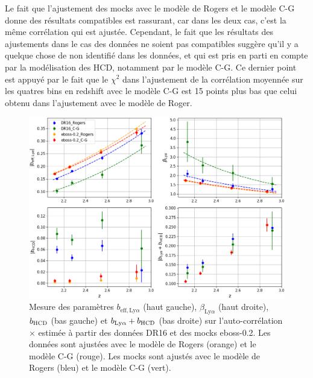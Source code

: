 \documentclass[11pt, twoside, a4paper, openright]{report}
\begin{document}
Le fait que l'ajustement des mocks avec le modèle de Rogers et le modèle C-G donne des résultats compatibles est rassurant, car dans les deux cas, c'est la même corrélation qui est ajustée. Cependant, le fait que les résultats des ajustements dans le cas des données ne soient pas compatibles suggère qu'il y a quelque chose de non identifié dans les données, et qui est pris en parti en compte par la modélisation des HCD, notamment par le modèle C-G. Ce dernier point est appuyé par le fait que le $\chi^2$ dans l'ajustement de la corrélation moyennée sur les quatres bins en redshift avec le modèle C-G est 15 points plus bas que celui obtenu dans l'ajustement avec le modèle de Roger.

\begin{figure}
  \centering
  \includegraphics[scale=0.44]{bias_CG_mask}
  \caption{Mesure des paramètres $b_{\mathrm{eff},\mathrm{Ly}\alpha}$ (haut gauche), $\beta_{\mathrm{Ly}\alpha}$ (haut droite), $b_{\textsc{HCD}}$ (bas gauche) et $b_{\mathrm{Ly}\alpha} + b_{\textsc{HCD}}$ (bas droite) sur l'auto-corrélation \lya$\times$\lya{} estimée à partir des données DR16 et des mocks eboss-0.2. Les données sont ajustées avec le modèle de Rogers (orange) et le modèle C-G (rouge). Les mocks sont ajustés avec le modèle de Rogers (bleu) et le modèle C-G (vert).}
  \label{fig:bias_CG_mask}
\end{figure}
\end{document}
